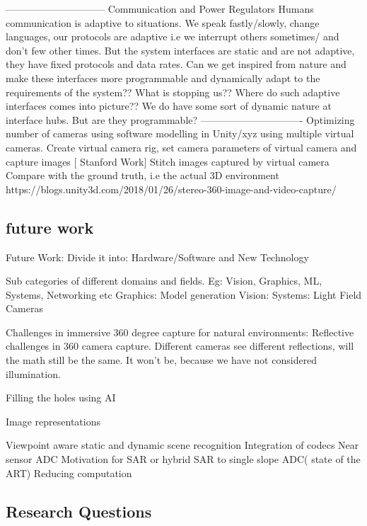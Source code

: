 ------------------------------
Communication and Power Regulators
Humans communication is adaptive to situations. We speak fastly/slowly, change languages, our protocols are adaptive i.e we interrupt others sometimes/ and don't few other times. But the system interfaces are static and are not adaptive, they have fixed protocols and data rates. Can we get inspired from nature and make these interfaces more programmable and dynamically adapt to the requirements of the system?? What is stopping us?? 
Where do such adaptive interfaces comes into picture?? We do have some sort of dynamic nature at interface hubs. But are they programmable?
-------------------------------
Optimizing number of cameras using software modelling in Unity/xyz using multiple virtual cameras. 
Create virtual camera rig, set camera parameters of virtual camera and capture images [ Stanford Work]
Stitch images captured by virtual camera 
Compare with the ground truth, i.e the actual 3D environment 
https://blogs.unity3d.com/2018/01/26/stereo-360-image-and-video-capture/

\subsection{future work}


Future Work:
Divide it into:
Hardware/Software and New Technology

Sub categories of different domains and fields. 
Eg: Vision, Graphics, ML, Systems, Networking etc
Graphics: Model generation 
Vision: 
Systems: Light Field Cameras

Challenges in immersive 360 degree capture for natural environments:
Reflective challenges in 360 camera capture. Different cameras see different reflections, will the math still be the same. It won't be, because we have not considered illumination. 

Filling the holes using AI

Image representations

Viewpoint aware static and dynamic scene recognition
Integration of codecs 
Near sensor ADC
Motivation for SAR or hybrid SAR to single slope ADC( state of the ART)
Reducing computation 

\subsection{Research Questions}


